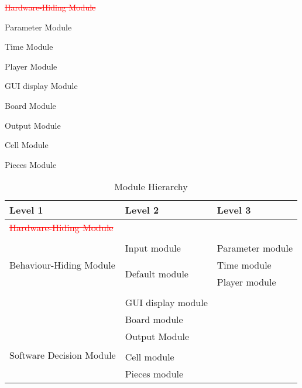 \documentclass[12pt, titlepage]{article}
\newcounter{mnum}
\newcommand{\mthemnum}{M\themnum}
\begin{document}
\begin{description}

\item
\textcolor{red}{\sout{Hardware-Hiding Module}}

\item [\refstepcounter{mnum} \mthemnum \label{mPAR}:] Parameter Module
\item [\refstepcounter{mnum} \mthemnum \label{mT}:] Time Module
\item [\refstepcounter{mnum} \mthemnum \label{mP}:] Player Module
\item [\refstepcounter{mnum} \mthemnum \label{mGUI}:] GUI display Module
\item [\refstepcounter{mnum} \mthemnum \label{mB}:] Board Module
\item [\refstepcounter{mnum} \mthemnum \label{mOUT}:] Output Module
\item [\refstepcounter{mnum} \mthemnum \label{mC}:] Cell Module
\item [\refstepcounter{mnum} \mthemnum \label{mPI}:] Pieces Module
\end{description}


\begin{table}[h!]
\centering
\begin{tabular}{p{} p{} p{}}
\toprule
\textbf{Level 1} & \textbf{Level 2} & \textbf{Level 3} \\
\midrule


\textcolor{red}{\sout{{Hardware-Hiding Module}}} \\
\midrule

\multirow{5}{0.3\textwidth}{Behaviour-Hiding Module}\\

& \multirow{1}{0.3\textwidth}{Input module}&{Parameter module}\\
& \multirow{2}{0.3\textwidth}{Default module}&{Time module}\\
& \multirow{2}{0.3\textwidth}{}&{Player module}\\\\
& {GUI display module}\\
& {Board module}\\
& {Output Module} \\
\midrule


\multirow{2}{0.3\textwidth}{Software Decision Module}\\
& Cell module\\
& Pieces module\\
\bottomrule

\end{tabular}
\caption{Module Hierarchy}
\label{TblMH}
\end{table}
\end{document}
